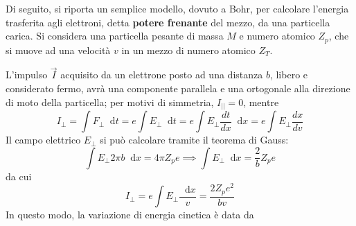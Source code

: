 \documentclass[11pt, a4paper]{scrartcl}
\theoremstyle{style}
\theoremstyle{style1}
\newcommand{\dd}{\mathop{}\!\mathrm{d}}
\numberwithin{equation}{subsection}
\begin{document}
\begin{center}
	\begin{minipage}
		{.45\columnwidth}
Di seguito, si riporta un semplice modello, dovuto a Bohr, per calcolare l'energia trasferita agli elettroni, detta \textbf{potere frenante} del mezzo, da una particella carica.
Si considera una particella pesante di massa $M$ e numero atomico $Z_p$, che si muove ad una velocit\`a $v$ in un mezzo di numero atomico $Z_T$.
	\end{minipage}
	\hfill
	\begin{minipage}
		{.45\columnwidth}
	\centering
	\end{minipage}
\end{center}
L'impulso $\vec{I}$ acquisito da un elettrone posto ad una distanza $b$, libero e considerato fermo, avr\`a una componente parallela e una ortogonale alla direzione di moto della particella; per motivi di simmetria, $I_{| |} = 0$, mentre
\begin{equation}
	I_\perp = \int  F_\perp \dd t = e \int  E_\perp \dd t = e \int E_\perp \frac{d t}{d x}  \dd x = e \int E_\perp \frac{d x}{d v} 
\end{equation}
Il campo elettrico $E_\perp$ si pu\`o calcolare tramite il teorema di Gauss:
\[
\int E_\perp 2\pi b \dd x = 4 \pi Z_p e \implies \int E_\perp \dd x = \frac{2}{b}Z_p e
\] 
da cui 
\begin{equation}
I_\perp= e \int E_\perp \frac{\dd x}{v} = \frac{2 Z_p e^2}{bv}
\end{equation}
In questo modo, la variazione di energia cinetica \`e data da
\end{document}
